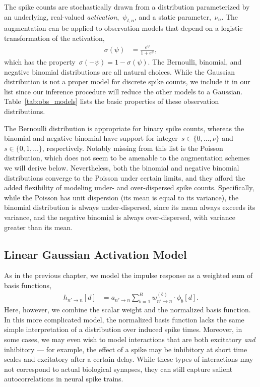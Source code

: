 The spike counts are stochastically drawn from a distribution
parameterized by an underlying, real-valued
\emph{activation},~$\psi_{t,n}$, and a static parameter,~$\nu_n$. 
The \polyagamma augmentation can be applied to observation models 
that depend on a logistic transformation of the activation,
\begin{align*}
  \sigma(\psi) &= \frac{e^\psi}{1+e^\psi},
\end{align*}
which has the property~$\sigma(-\psi) = 1-\sigma(\psi)$. The Bernoulli,
binomial, and negative binomial distributions are all natural choices.
While the Gaussian distribution is not a proper model for discrete
spike counts, we include it in our list since our inference procedure will 
reduce the other models to a Gaussian. Table~\ref{tab:obs_models} 
lists the basic properties of these observation distributions.

The Bernoulli distribution is appropriate for binary spike counts,
whereas the binomial and negative binomial have support
for integer~$s\in \{0, \ldots, \nu\}$ and~$s \in \{0, 1, \ldots \}$, respectively.
Notably missing from this list is the Poisson distribution,
which does not seem to be amenable to the augmentation schemes
we will derive below. Nevertheless, both the binomial and negative
binomial distributions converge to the Poisson under certain
limits, and they afford the added flexibility of modeling under- and
over-dispersed spike counts. Specifically, while the Poisson has unit 
dispersion (its mean is equal to its variance), the binomial distribution 
is always under-dispersed, since its mean always exceeds its variance, 
and the negative binomial is always over-dispersed, with variance greater 
than its mean.

\subsection{Linear Gaussian Activation Model}
As in the previous chapter, we model the impulse response as a weighted 
sum of basis functions,
\begin{align}
\label{eq:glm_impulse}
h_{n' \to n}[d] &= a_{n' \to n} \sum_{b=1}^B w_{n' \to n}^{(b)} \cdot \phi_b[d].
\end{align}
Here, however, we combine the scalar weight and 
the normalized basis function. In this more complicated model, the normalized 
basis function lacks the same simple interpretation of a distribution over 
induced spike times.  Moreover, in some cases, we may even wish to model interactions that 
are both excitatory \emph{and} inhibitory --- for example, the effect of a
spike may be inhibitory at short time scales and excitatory after a certain
delay. While these types of interactions may not correspond to actual biological synapses, they 
can still capture salient autocorrelations in neural spike trains.

